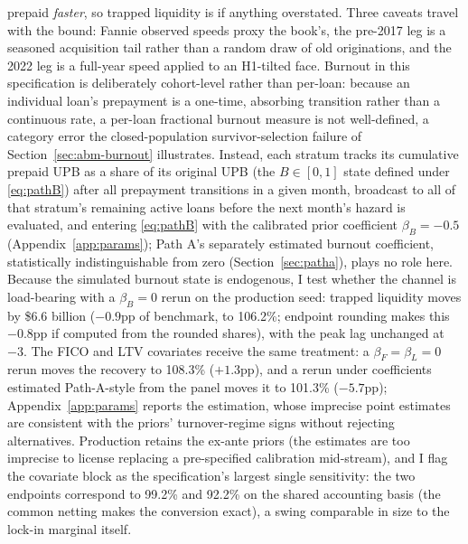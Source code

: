 \documentclass[12pt]{article}
\begin{document}
prepaid \emph{faster}, so trapped liquidity is if anything overstated. Three caveats travel with the bound: Fannie observed speeds proxy the book's, the pre-2017 leg is a seasoned acquisition tail rather than a random draw of old originations, and the 2022 leg is a full-year speed applied to an H1-tilted face. Burnout in this specification is deliberately cohort-level rather than per-loan: because an individual loan's prepayment is a one-time, absorbing transition rather than a continuous rate, a per-loan fractional burnout measure is not well-defined, a category error the closed-population survivor-selection failure of Section~\ref{sec:abm-burnout} illustrates. Instead, each stratum tracks its cumulative prepaid UPB as a share of its original UPB (the $B \in [0,1]$ state defined under \eqref{eq:pathB}) after all prepayment transitions in a given month, broadcast to all of that stratum's remaining active loans before the next month's hazard is evaluated, and entering \eqref{eq:pathB} with the calibrated prior coefficient $\beta_B = -0.5$ (Appendix~\ref{app:params}); Path A's separately estimated burnout coefficient, statistically indistinguishable from zero (Section~\ref{sec:patha}), plays no role here. Because the simulated burnout state is endogenous, I test whether the channel is load-bearing with a $\beta_B = 0$ rerun on the production seed: trapped liquidity moves by \$6.6 billion ($-0.9$pp of benchmark, to 106.2\%; endpoint rounding makes this $-0.8$pp if computed from the rounded shares), with the peak lag unchanged at $-3$. The FICO and LTV covariates receive the same treatment: a $\beta_F = \beta_L = 0$ rerun moves the recovery to 108.3\% ($+1.3$pp), and a rerun under coefficients estimated Path-A-style from the panel moves it to 101.3\% ($-5.7$pp); Appendix~\ref{app:params} reports the estimation, whose imprecise point estimates are consistent with the priors' turnover-regime signs without rejecting alternatives. Production retains the ex-ante priors (the estimates are too imprecise to license replacing a pre-specified calibration mid-stream), and I flag the covariate block as the specification's largest single sensitivity: the two endpoints correspond to 99.2\% and 92.2\% on the shared accounting basis (the common netting makes the conversion exact), a swing comparable in size to the lock-in marginal itself.
\end{document}
